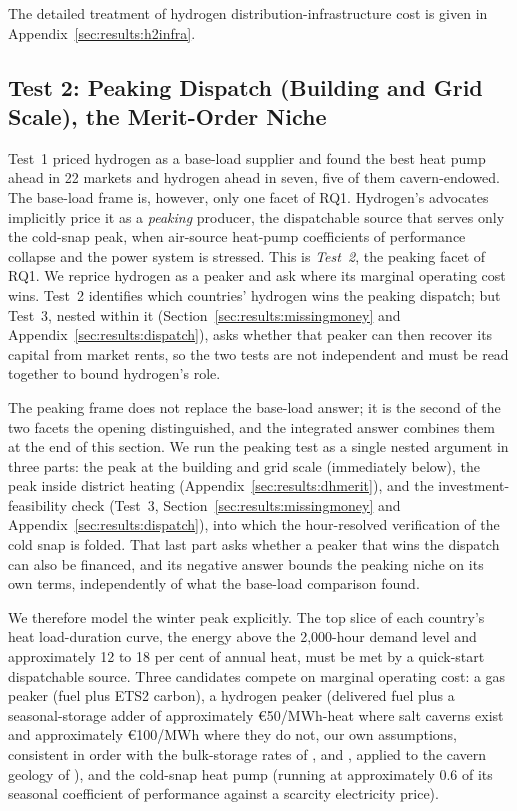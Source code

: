 \noindent The detailed treatment of hydrogen distribution-infrastructure cost is given in Appendix~\ref{sec:results:h2infra}.

\subsection{Test 2: Peaking Dispatch (Building and Grid Scale), the Merit-Order Niche}
\label{sec:results:meritorder}

Test~1 priced hydrogen as a base-load supplier and found the best heat pump ahead in 22
markets and hydrogen ahead in seven, five of them cavern-endowed. The base-load frame
is, however, only one facet of RQ1. Hydrogen's advocates implicitly price it as a
\emph{peaking} producer, the dispatchable source that serves only the cold-snap peak,
when air-source heat-pump coefficients of performance collapse and the power system is
stressed. This is \emph{Test~2}, the peaking facet of RQ1. We reprice hydrogen as a peaker and ask where its marginal operating cost wins. Test~2 identifies which
countries' hydrogen wins the peaking dispatch; but Test~3, nested within it
(Section~\ref{sec:results:missingmoney} and Appendix~\ref{sec:results:dispatch}), asks whether
that peaker can then recover its capital from market rents, so the two tests are not
independent and must be read together to bound hydrogen's role.

The peaking frame does not replace the base-load answer; it is the
second of the two facets the opening distinguished, and the integrated answer combines
them at the end of this section. We run the peaking test as a single nested argument in
three parts: the peak at the building and grid scale (immediately below), the peak
inside district heating (Appendix~\ref{sec:results:dhmerit}), and the
investment-feasibility check (Test~3, Section~\ref{sec:results:missingmoney} and Appendix~\ref{sec:results:dispatch}), into which the hour-resolved verification of the cold snap
is folded. That last part asks whether a peaker that wins the dispatch can also be
financed, and its negative answer bounds the peaking niche on its own terms,
independently of what the base-load comparison found.

We therefore model the winter peak explicitly. The top slice of each country's
heat load-duration curve, the energy above the 2,000-hour demand level and
approximately 12 to 18 per cent of annual heat, must be met by a quick-start
dispatchable source. Three candidates compete on marginal operating cost: a gas
peaker (fuel plus ETS2 carbon), a hydrogen peaker (delivered fuel plus a
seasonal-storage adder of approximately \euro{}50/MWh-heat where salt caverns exist
and approximately \euro{}100/MWh where they do not, our own assumptions, consistent in
order with the bulk-storage rates of \citet{Lord2014GeologicStorage},
\citet{Papadias2021BulkStorage} and \citet{Talukdar2024UHSEurope}, applied to the
cavern geology of \citet{Caglayan2020caverns}),
and the cold-snap heat pump (running at approximately 0.6 of its seasonal
coefficient of performance against a scarcity electricity price).

